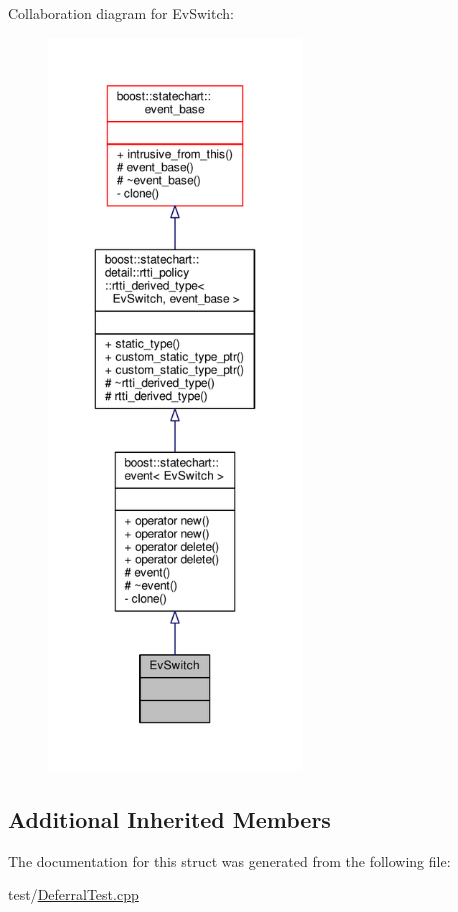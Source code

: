 Collaboration diagram for Ev\+Switch\+:
\nopagebreak
\begin{figure}[H]
\begin{center}
\leavevmode
\includegraphics[height=550pt]{struct_ev_switch__coll__graph}
\end{center}
\end{figure}
\subsection*{Additional Inherited Members}


The documentation for this struct was generated from the following file\+:\begin{DoxyCompactItemize}
\item 
test/\mbox{\hyperlink{_deferral_test_8cpp}{Deferral\+Test.\+cpp}}\end{DoxyCompactItemize}
